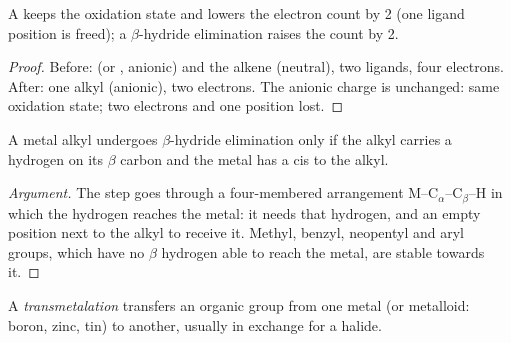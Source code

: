 \begin{proposition}\label{prop:b2:catalytic-cycles:insertion}
A  keeps the oxidation state and lowers the electron count by 2
(one ligand position is freed); a $\beta$-hydride elimination raises the count by 2.
\end{proposition}

\begin{proof}
Before:  (or , anionic) and the alkene (neutral), two ligands, four electrons.
After: one alkyl (anionic), two electrons. The anionic charge is unchanged: same
oxidation state; two electrons and one position lost.
\end{proof}

\begin{proposition}\label{prop:b2:catalytic-cycles:beta-h}
A metal alkyl undergoes $\beta$-hydride elimination only if the alkyl carries a hydrogen on
its $\beta$ carbon and the metal has a  cis to the alkyl.
\end{proposition}

\begin{proof}[Argument]
The step goes through a four-membered arrangement M--C$_\alpha$--C$_\beta$--H in which the
hydrogen reaches the metal: it needs that hydrogen, and an empty position next to the alkyl
to receive it. Methyl, benzyl, neopentyl and aryl groups, which have no $\beta$ hydrogen
able to reach the metal, are stable towards it.
\end{proof}

\begin{definition}[Transmetalation]\label{def:b2:catalytic-cycles:transmetalation}
A \emph{transmetalation} transfers an organic group from one metal
(or metalloid: boron, zinc, tin) to another, usually in exchange for a halide.
\end{definition}

